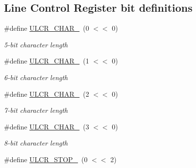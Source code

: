 \subsection*{Line Control Register bit definitions}
\begin{DoxyCompactItemize}
\item 
\mbox{\label{group__rtl22xx__uart_gadeeeae6058aa7bcf227665e2203dbff4}} 
\#define \mbox{\hyperlink{group__rtl22xx__uart_gadeeeae6058aa7bcf227665e2203dbff4}{U\+L\+C\+R\+\_\+\+C\+H\+A\+R\+\_}}~(0 $<$$<$ 0)
\begin{DoxyCompactList}\small\item\em 5-\/bit character length \end{DoxyCompactList}\item 
\mbox{\label{group__rtl22xx__uart_gad71d67ec7212f5bff65488ca3d123265}} 
\#define \mbox{\hyperlink{group__rtl22xx__uart_gad71d67ec7212f5bff65488ca3d123265}{U\+L\+C\+R\+\_\+\+C\+H\+A\+R\+\_}}~(1 $<$$<$ 0)
\begin{DoxyCompactList}\small\item\em 6-\/bit character length \end{DoxyCompactList}\item 
\mbox{\label{group__rtl22xx__uart_gacf692d8c9ba4076c7bbfa62747c5f553}} 
\#define \mbox{\hyperlink{group__rtl22xx__uart_gacf692d8c9ba4076c7bbfa62747c5f553}{U\+L\+C\+R\+\_\+\+C\+H\+A\+R\+\_}}~(2 $<$$<$ 0)
\begin{DoxyCompactList}\small\item\em 7-\/bit character length \end{DoxyCompactList}\item 
\mbox{\label{group__rtl22xx__uart_ga766ee4fa7d8b6e2d695f85e7c3808e96}} 
\#define \mbox{\hyperlink{group__rtl22xx__uart_ga766ee4fa7d8b6e2d695f85e7c3808e96}{U\+L\+C\+R\+\_\+\+C\+H\+A\+R\+\_}}~(3 $<$$<$ 0)
\begin{DoxyCompactList}\small\item\em 8-\/bit character length \end{DoxyCompactList}\item 
\mbox{\label{group__rtl22xx__uart_ga8d321ad8b491ee7118bb690cbf357364}} 
\#define \mbox{\hyperlink{group__rtl22xx__uart_ga8d321ad8b491ee7118bb690cbf357364}{U\+L\+C\+R\+\_\+\+S\+T\+O\+P\+\_}}~(0 $<$$<$ 2)
$$
\end{DoxyCompactItemize}
